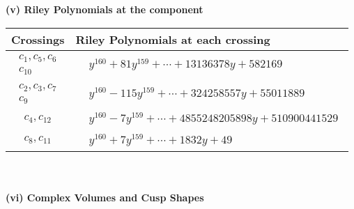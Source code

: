 \documentclass[1p]{elsarticle_modified}
\theoremstyle{definition}
\begin{document}
\newpage\renewcommand{\arraystretch}{1}
\flushleft \textbf{(v) Riley Polynomials at the component}\newline \\
\begin{tabular}{m{50pt}|m{274pt}}
Crossings & \hspace{64pt}Riley Polynomials at each crossing \\
\hline $$\begin{aligned}c_{1},c_{5},c_{6}\\c_{10}\end{aligned}$$&$\begin{aligned}
&y^{160}+81 y^{159}+\cdots+13136378 y+582169
\end{aligned}$\\
\hline $$\begin{aligned}c_{2},c_{3},c_{7}\\c_{9}\end{aligned}$$&$\begin{aligned}
&y^{160}-115 y^{159}+\cdots+324258557 y+55011889
\end{aligned}$\\
\hline $$\begin{aligned}c_{4},c_{12}\end{aligned}$$&$\begin{aligned}
&y^{160}-7 y^{159}+\cdots+4855248205898 y+510900441529
\end{aligned}$\\
\hline $$\begin{aligned}c_{8},c_{11}\end{aligned}$$&$\begin{aligned}
&y^{160}+7 y^{159}+\cdots+1832 y+49
\end{aligned}$\\
\hline
\end{tabular}\\~\\
\newpage\flushleft \textbf{(vi) Complex Volumes and Cusp Shapes}
\end{document}
